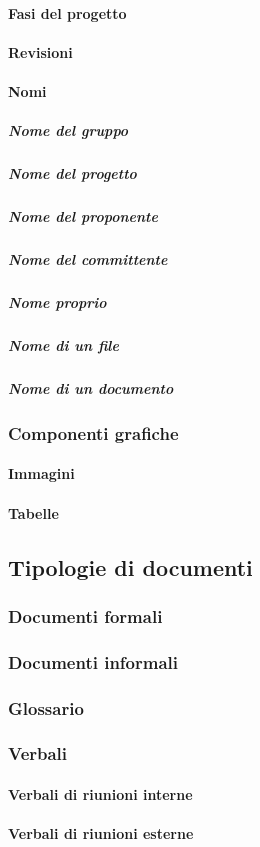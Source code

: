 \documentclass[../NormeProgetto.tex]{subfiles}
\begin{document}
			\paragraph{Fasi del progetto}
			\paragraph{Revisioni}
			\paragraph{Nomi}
				\subparagraph{Nome del gruppo}
				\subparagraph{Nome del progetto}
				\subparagraph{Nome del proponente}
				\subparagraph{Nome del committente}
				\subparagraph{Nome proprio}
				\subparagraph{Nome di un file}
				\subparagraph{Nome di un documento}
		\subsubsection{Componenti grafiche}
			\paragraph{Immagini}
			\paragraph{Tabelle}
	\subsection{Tipologie di documenti}
		\subsubsection{Documenti formali}
		\subsubsection{Documenti informali}
		\subsubsection{Glossario}
		\subsubsection{Verbali}
			\paragraph{Verbali di riunioni interne}
			\paragraph{Verbali di riunioni esterne}
\end{document}
